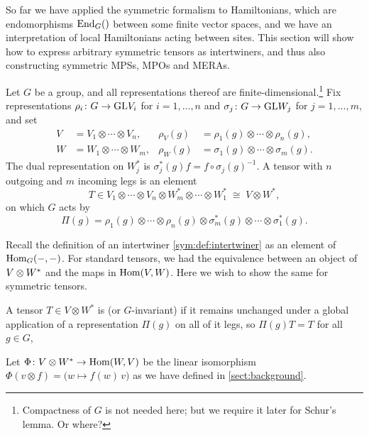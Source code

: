 So far we have applied the symmetric formalism to Hamiltonians, which are
endomorphisms $\operatorname{End}_G()$ between some finite vector spaces, and we have an
interpretation of local Hamiltonians acting between sites. This section will
show how to express arbitrary symmetric tensors as intertwiners, and thus also
constructing symmetric MPSs, MPOs and MERAs.

Let $G$ be a group, and all representations thereof are
finite-dimensional.\footnote{Compactness of $G$ is not needed here; but we
require it later for Schur's lemma. Or where?} Fix representations $\rho_i\colon
G\to\mathrm{GL}{V_i}$ for $i=1,\dots,n$ and $\sigma_j\colon G\to\mathrm{GL}{W_j}$ for
$j=1,\dots,m$, and set
\begin{align*}
  V &= V_1\otimes\cdots\otimes V_n, &
  \rho_V(g) &= \rho_1(g)\otimes\cdots\otimes\rho_n(g),\\
  W &= W_1\otimes\cdots\otimes W_m, &
  \rho_W(g) &= \sigma_1(g)\otimes\cdots\otimes\sigma_m(g).
\end{align*}
The dual representation on $W_j^\ast$ is $\sigma_j^\ast(g)f =
f\circ\sigma_j(g)^{-1}$. A tensor with $n$ outgoing and $m$ incoming legs is an
element
\[
  T\in V_1\otimes\cdots\otimes V_n\otimes W_m^\ast\otimes\cdots\otimes W_1^\ast
  \;\cong\; V\otimes W^\ast,
\]
on which $G$ acts by
\begin{equation}\label{sym:eq:Pi}
  \Pi(g)=\rho_1(g)\otimes\cdots\otimes\rho_n(g)\otimes
         \sigma_m^\ast(g)\otimes\cdots\otimes\sigma_1^\ast(g).
\end{equation}

Recall the definition of an intertwiner \cref{sym:def:intertwiner} as an element
of $\operatorname{Hom}_G(-,-)$. For standard tensors, we had the equivalence between an object
of $V \otimes W^\ast$ and the maps in $\operatorname{Hom}(V,W)$. Here we wish to show the same for
symmetric tensors.


\begin{definition}\label{def:symmetricTensor} A
  tensor $T\in V\otimes W^\ast$ is \emph{} (or $G$-invariant)
  if it remains unchanged under a global application of a representation
  $\Pi(g)$ on all of it legs, so  $\Pi(g)T=T$ for all $g\in G$, 
\end{definition}

Let $\Phi\colon V\otimes W^\ast\to\operatorname{Hom}(W,V)$ be the linear isomorphism
$\Phi(v\otimes f)=\bigl(w\mapsto f(w)\,v\bigr)$ as we have defined in
\cref{sect:background}.

